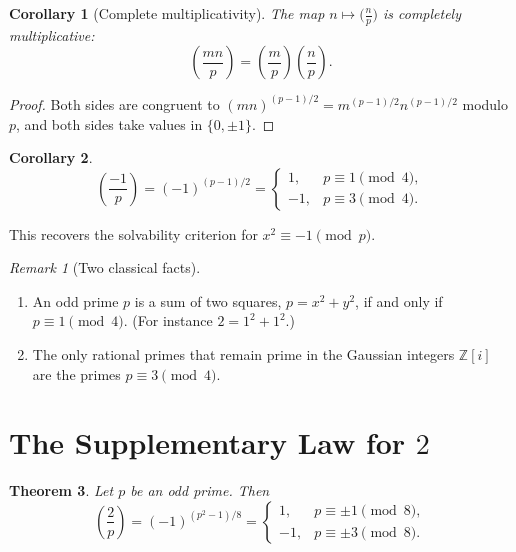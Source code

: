 \documentclass[11pt]{article}
\newtheorem{theorem}{Theorem}[section]
\newtheorem{corollary}[theorem]{Corollary}
\theoremstyle{remark}
\newtheorem*{remark}{Remark}
\newcommand{\Z}{\mathbb Z}
\begin{document}
\begin{corollary}[Complete multiplicativity]
The map $n\mapsto\bigl(\frac np\bigr)$ is completely multiplicative:
\[
    \left(\frac{mn}{p}\right)
    =
    \left(\frac mp\right)
    \left(\frac np\right).
\]
\end{corollary}

\begin{proof}
Both sides are congruent to $(mn)^{(p-1)/2}=m^{(p-1)/2}n^{(p-1)/2}$
modulo $p$, and both sides take values in $\{0,\pm 1\}$.
\end{proof}

\begin{corollary}
\[
\left(\frac{-1}{p}\right)
=
(-1)^{(p-1)/2}
=
\begin{cases}
1,& p\equiv 1\pmod 4,\\[1mm]
-1,& p\equiv 3\pmod 4.
\end{cases}
\]
\end{corollary}

This recovers the solvability criterion for $x^2\equiv -1\pmod p$.

\begin{remark}[Two classical facts]
\begin{enumerate}[label=\arabic*.]
    \item An odd prime $p$ is a sum of two squares, $p=x^2+y^2$, if and only if
    $p\equiv 1\pmod 4$. (For instance $2=1^2+1^2$.)

    \item The only rational primes that remain prime in the Gaussian integers
    $\Z[i]$ are the primes $p\equiv 3\pmod 4$.
\end{enumerate}
\end{remark}

\section{The Supplementary Law for $2$}

\begin{theorem}
Let $p$ be an odd prime. Then
\[
\left(\frac 2p\right)
=
(-1)^{(p^2-1)/8}
=
\begin{cases}
1,& p\equiv\pm 1\pmod 8,\\[1mm]
-1,& p\equiv\pm 3\pmod 8.
\end{cases}
\]
\end{theorem}
\end{document}
